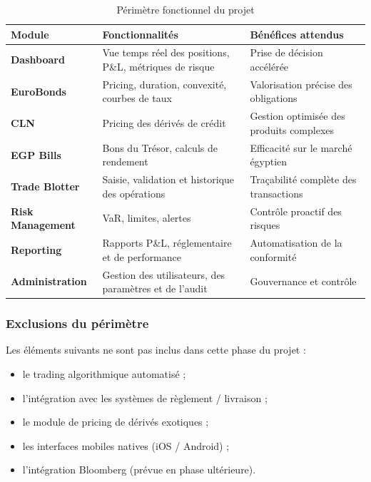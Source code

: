 \begin{table}[H]
\centering
\renewcommand{\arraystretch}{1.4}
\begin{tabularx}{\textwidth}{>{\bfseries}l X X}
\toprule
Module & \textbf{Fonctionnalités} & \textbf{Bénéfices attendus} \\
\midrule
Dashboard        & Vue temps réel des positions, P\&L, métriques de risque & Prise de décision accélérée \\
EuroBonds        & Pricing, duration, convexité, courbes de taux           & Valorisation précise des obligations \\
CLN              & Pricing des dérivés de crédit                           & Gestion optimisée des produits complexes \\
EGP Bills        & Bons du Trésor, calculs de rendement                    & Efficacité sur le marché égyptien \\
Trade Blotter    & Saisie, validation et historique des opérations         & Traçabilité complète des transactions \\
Risk Management  & VaR, limites, alertes                                   & Contrôle proactif des risques \\
Reporting        & Rapports P\&L, réglementaire et de performance          & Automatisation de la conformité \\
Administration   & Gestion des utilisateurs, des paramètres et de l'audit  & Gouvernance et contrôle \\
\bottomrule
\end{tabularx}
\caption{Périmètre fonctionnel du projet}
\label{tab:perimetre}
\end{table}

\subsubsection{Exclusions du périmètre}

\hspace{1cm} Les éléments suivants ne sont pas inclus dans cette phase du projet :

\begin{itemize}
    \item le trading algorithmique automatisé ;
    \item l'intégration avec les systèmes de règlement / livraison ;
    \item le module de pricing de dérivés exotiques ;
    \item les interfaces mobiles natives (iOS / Android) ;
    \item l'intégration Bloomberg (prévue en phase ultérieure).
\end{itemize}


